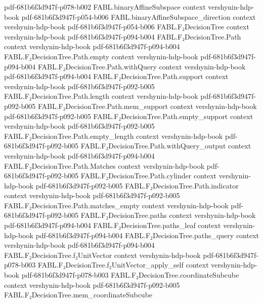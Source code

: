 \begin{theorem}
  {pdf-681b6f3d947f-p078-b002}
\proofstep
  {FABL.binaryAffineSubspace}
  {context}
  {vershynin-hdp-book}
  {pdf-681b6f3d947f-p054-b006}
\proofstep
  {FABL.binaryAffineSubspace_direction}
  {context}
  {vershynin-hdp-book}
  {pdf-681b6f3d947f-p054-b006}
\proofstep
  {FABL.F₂DecisionTree}
  {context}
  {vershynin-hdp-book}
  {pdf-681b6f3d947f-p094-b004}
\proofstep
  {FABL.F₂DecisionTree.Path}
  {context}
  {vershynin-hdp-book}
  {pdf-681b6f3d947f-p094-b004}
\proofstep
  {FABL.F₂DecisionTree.Path.empty}
  {context}
  {vershynin-hdp-book}
  {pdf-681b6f3d947f-p094-b004}
\proofstep
  {FABL.F₂DecisionTree.Path.withQuery}
  {context}
  {vershynin-hdp-book}
  {pdf-681b6f3d947f-p094-b004}
\proofstep
  {FABL.F₂DecisionTree.Path.support}
  {context}
  {vershynin-hdp-book}
  {pdf-681b6f3d947f-p092-b005}
\proofstep
  {FABL.F₂DecisionTree.Path.length}
  {context}
  {vershynin-hdp-book}
  {pdf-681b6f3d947f-p092-b005}
\proofstep
  {FABL.F₂DecisionTree.Path.mem_support}
  {context}
  {vershynin-hdp-book}
  {pdf-681b6f3d947f-p092-b005}
\proofstep
  {FABL.F₂DecisionTree.Path.empty_support}
  {context}
  {vershynin-hdp-book}
  {pdf-681b6f3d947f-p092-b005}
\proofstep
  {FABL.F₂DecisionTree.Path.empty_length}
  {context}
  {vershynin-hdp-book}
  {pdf-681b6f3d947f-p092-b005}
\proofstep
  {FABL.F₂DecisionTree.Path.withQuery_output}
  {context}
  {vershynin-hdp-book}
  {pdf-681b6f3d947f-p094-b004}
\proofstep
  {FABL.F₂DecisionTree.Path.Matches}
  {context}
  {vershynin-hdp-book}
  {pdf-681b6f3d947f-p092-b005}
\proofstep
  {FABL.F₂DecisionTree.Path.cylinder}
  {context}
  {vershynin-hdp-book}
  {pdf-681b6f3d947f-p092-b005}
\proofstep
  {FABL.F₂DecisionTree.Path.indicator}
  {context}
  {vershynin-hdp-book}
  {pdf-681b6f3d947f-p092-b005}
\proofstep
  {FABL.F₂DecisionTree.Path.matches_empty}
  {context}
  {vershynin-hdp-book}
  {pdf-681b6f3d947f-p092-b005}
\proofstep
  {FABL.F₂DecisionTree.paths}
  {context}
  {vershynin-hdp-book}
  {pdf-681b6f3d947f-p094-b004}
\proofstep
  {FABL.F₂DecisionTree.paths_leaf}
  {context}
  {vershynin-hdp-book}
  {pdf-681b6f3d947f-p094-b004}
\proofstep
  {FABL.F₂DecisionTree.paths_query}
  {context}
  {vershynin-hdp-book}
  {pdf-681b6f3d947f-p094-b004}
\proofstep
  {FABL.F₂DecisionTree.f₂UnitVector}
  {context}
  {vershynin-hdp-book}
  {pdf-681b6f3d947f-p078-b003}
\proofstep
  {FABL.F₂DecisionTree.f₂UnitVector_apply_self}
  {context}
  {vershynin-hdp-book}
  {pdf-681b6f3d947f-p078-b003}
\proofstep
  {FABL.F₂DecisionTree.coordinateSubcube}
  {context}
  {vershynin-hdp-book}
  {pdf-681b6f3d947f-p092-b005}
\proofstep
  {FABL.F₂DecisionTree.mem_coordinateSubcube}

\end{theorem}
